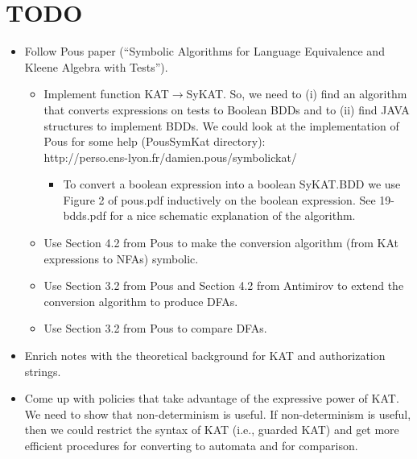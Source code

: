 \documentclass[10pt]{article}
\begin{document}
\section*{TODO}
\begin{itemize}
\item Follow Pous paper (``Symbolic Algorithms for Language Equivalence and Kleene Algebra with Tests'').
\begin{itemize}
\item Implement function KAT$\rightarrow$SyKAT. So, we need to (i) find an algorithm that converts expressions on tests to Boolean BDDs and to (ii) find JAVA structures to implement BDDs. We could look at the implementation of Pous for some help (PousSymKat directory):\\
http://perso.ens-lyon.fr/damien.pous/symbolickat/
\begin{itemize}
\item To convert a boolean expression into a boolean SyKAT.BDD we use Figure 2 of pous.pdf inductively on the boolean expression. See 19-bdds.pdf for a nice schematic explanation of the algorithm.
\end{itemize}
\item Use Section 4.2 from Pous to make the conversion algorithm (from KAt expressions to NFAs) symbolic.
\item Use Section 3.2 from Pous and Section 4.2 from Antimirov to extend the conversion algorithm to produce DFAs.
\item Use Section 3.2 from Pous to compare DFAs.
\end{itemize}  
\item Enrich notes with the theoretical background for KAT and authorization strings.
\item Come up with policies that take advantage of the expressive power of KAT. We need to show that non-determinism is useful. If non-determinism is useful, then we could restrict the syntax of KAT (i.e., guarded KAT) and get more efficient procedures for converting to automata and for comparison.
\end{itemize}
\newpage
\end{document}
